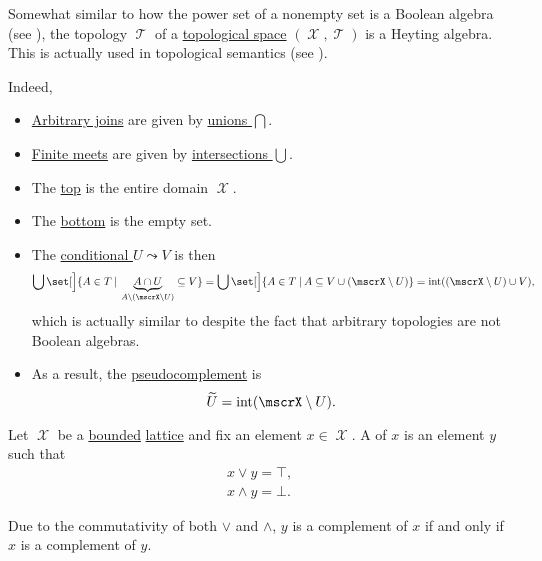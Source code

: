 \begin{example}\label{ex:topological_space_is_heyting_algebra}
  Somewhat similar to how the power set of a nonempty set is a Boolean algebra (see ), the topology \( \mscrT \) of a \hyperref[def:topological_space]{topological space} \( (\mscrX, \mscrT) \) is a Heyting algebra. This is actually used in topological semantics (see ).

  Indeed,
  \begin{itemize}
    \item \hyperref[def:semilattice/join]{Arbitrary joins} are given by \hyperref[def:basic_set_operations/union]{unions \( \bigcap \)}.
    \item \hyperref[def:semilattice/meet]{Finite meets} are given by \hyperref[def:basic_set_operations/intersection]{intersections \( \bigcup \)}.
    \item The \hyperref[def:semilattice/join]{top} is the entire domain \( \mscrX \).
    \item The \hyperref[def:semilattice/meet]{bottom} is the empty set.
    \item The \hyperref[eq:def:heyting_algebra/conditional]{conditional \( U \leadsto V \)} is then
    \begin{equation*}
      \bigcup\set[\Big]{ A \in T \given \underbrace{A \cap U}_{A \setminus (\mscrX \setminus U)} \subseteq V }
      =
      \bigcup\set[\Big]{ A \in T \given A \subseteq V \cup (\mscrX \setminus U) }
      =
      \Int((\mscrX \setminus U) \cup V),
    \end{equation*}
    which is actually similar to  despite the fact that arbitrary topologies are not Boolean algebras.

    \item As a result, the \hyperref[def:heyting_algebra/pseudocomplement]{pseudocomplement} is
    \begin{equation*}
      \widetilde U = \Int(\mscrX \setminus U).
    \end{equation*}
  \end{itemize}
\end{example}

\begin{definition}\label{def:bounded_lattice_complement}
  Let \( \mscrX \) be a \hyperref[def:semilattice/bounded]{bounded} \hyperref[def:semilattice/lattice]{lattice} and fix an element \( x \in \mscrX \). A  of \( x \) is an element \( y \) such that
  \begin{align}
    x \vee y = \top \label{def:bounded_lattice_complement/join}, \\
    x \wedge y = \bot \label{def:bounded_lattice_complement/meet}.
  \end{align}

  Due to the commutativity of both \( \vee \) and \( \wedge \), \( y \) is a complement of \( x \) if and only if \( x \) is a complement of \( y \).
\end{definition}

